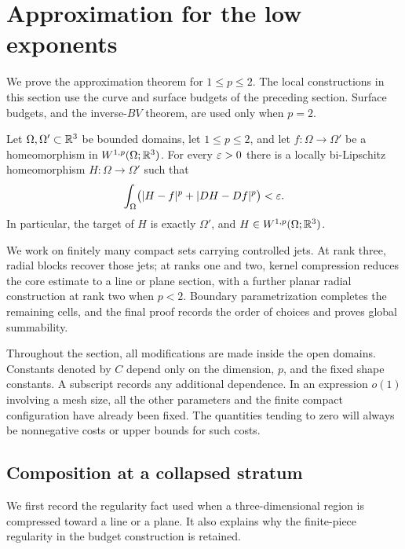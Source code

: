 \section{Approximation for the low exponents}\label{sec:low-assembly}

We prove the approximation theorem for $1\le p\le2$.  The local
constructions in this section use the curve and surface budgets of the
preceding section.  Surface budgets, and the inverse-$BV$ theorem, are
used only when $p=2$.

\begin{theorem}\label{la:approximation}
Let $\Omega,\Omega'\subset\mathbb R^3$ be bounded domains, let $1\le p\le2$, and
let $f:\Omega\to\Omega'$ be a homeomorphism in
$W^{1,p}(\Omega;\mathbb R^3)$.  For every $\varepsilon>0$ there is a locally
bi-Lipschitz homeomorphism $H:\Omega\to\Omega'$ such that
\begin{equation}\label{la:goal}
 \int_\Omega \bigl(|H-f|^p+|DH-Df|^p\bigr)<\varepsilon.
\end{equation}
In particular, the target of $H$ is exactly $\Omega'$, and
$H\in W^{1,p}(\Omega;\mathbb R^3)$.
\end{theorem}

We work on finitely many compact sets carrying controlled jets.
At rank three, radial blocks recover those jets; at ranks one and two,
kernel compression reduces the core estimate to a line or plane section,
with a further planar radial construction at rank two when $p<2$.
Boundary parametrization completes the remaining cells, and the final
proof records the order of choices and proves global summability.

Throughout the section, all modifications are made inside the open
domains.  Constants denoted by $C$ depend only on the dimension, $p$,
and the fixed shape constants.  A subscript records any additional
dependence.  In an expression $o(1)$ involving a mesh size, all the
other parameters and the finite compact configuration have already
been fixed.  The quantities tending to zero will always be
nonnegative costs or upper bounds for such costs.

\subsection{Composition at a collapsed stratum}

We first record the regularity fact used when a three-dimensional
region is compressed toward a line or a plane.  It also explains why
the finite-piece regularity in the budget construction is retained.

